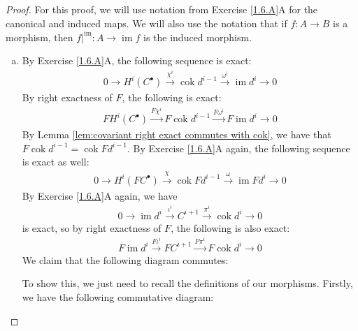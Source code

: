 \documentclass{article}
\DeclareMathOperator{\im}{im}
\DeclareMathOperator{\cok}{cok}
\begin{document}
\begin{proof}
    For this proof, we will use notation from Exercise \ref{1.6.A}A for the canonical and induced maps. We will also use the notation that if $f:A\to B$ is a morphism, then $f\vert^{\im} :A\to \im f$ is the induced morphism.
    \begin{enumerate}[(a)]
        \item By Exercise \ref{1.6.A}A, the following sequence is exact:
    \begin{align*}
        0\rightarrow H^i(C^\bullet) \xrightarrow{\chi^i}\cok d^{i-1} \xrightarrow{\omega^i}\im d^i\rightarrow 0
    \end{align*}
        By right exactness of $F$, the following is exact:
        \begin{align*}
            FH^i(C^\bullet) \xrightarrow{F\chi^i} F\cok d^{i-1} \xrightarrow{F \omega^i} F\im d^i \rightarrow 0
        \end{align*}
        By Lemma \ref{lem:covariant right exact commutes with cok}, we have that $F\cok d^{i-1}=\cok Fd^{i-1}$. By Exercise \ref{1.6.A}A again, the following sequence is exact as well:
        \begin{align*}
            0\rightarrow H^i(FC^\bullet) \xrightarrow{\chi}\cok Fd^{i-1} \xrightarrow{\omega}\im Fd^i\rightarrow 0
        \end{align*}
        By Exercise \ref{1.6.A}A again, we have
        \begin{align*}
            0\rightarrow \im d^i \xrightarrow{\iota^i} C^{i+1} \xrightarrow{\pi^i} \cok d^i \rightarrow 0
        \end{align*}
        is exact, so by right exactness of $F$, the following is also exact:
        \begin{align*}
            F\im d^i \xrightarrow{F\iota^{i}} FC^{i+1} \xrightarrow{F\pi^i} F\cok d^i \rightarrow 0
        \end{align*}
    We claim that the following diagram commutes:
    \begin{center}
    \end{center}
   To show this, we just need to recall the definitions of our morphisms. Firstly, we have the following commutative diagram:
   \begin{center}

\end{center}
\end{enumerate}
\end{proof}
\end{document}
